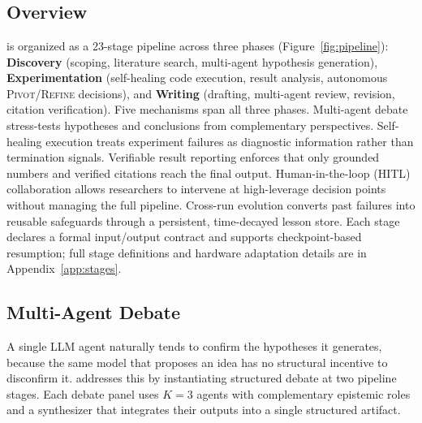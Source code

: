 \vspace{-0.5em}
\section{\system{}}
\label{sec:method}
\vspace{-0.5em}

\vspace{-0.3em}
\subsection{Overview}
\label{sec:overview}
\vspace{-0.3em}

\system{} is organized as a 23-stage pipeline across three phases (Figure~\ref{fig:pipeline}):
\textbf{Discovery} (scoping, literature search, multi-agent hypothesis generation),
\textbf{Experimentation} (self-healing code execution, result analysis, autonomous \textsc{Pivot}/\textsc{Refine} decisions),
and \textbf{Writing} (drafting, multi-agent review, revision, citation verification).
Five mechanisms span all three phases.
Multi-agent debate stress-tests hypotheses and conclusions from complementary perspectives.
Self-healing execution treats experiment failures as diagnostic information rather than termination signals.
Verifiable result reporting enforces that only grounded numbers and verified citations reach the final output.
Human-in-the-loop (HITL) collaboration allows researchers to intervene at high-leverage decision points without managing the full pipeline.
Cross-run evolution converts past failures into reusable safeguards through a persistent, time-decayed lesson store.
Each stage declares a formal input/output contract and supports checkpoint-based resumption; full stage definitions and hardware adaptation details are in Appendix~\ref{app:stages}.

\vspace{-0.3em}
\subsection{Multi-Agent Debate}
\label{sec:debate}
\vspace{-0.3em}

A single LLM agent naturally tends to confirm the hypotheses it generates, because the same model that proposes an idea has no structural incentive to disconfirm it.
\system{} addresses this by instantiating structured debate at two pipeline stages.
Each debate panel uses $K{=}3$ agents with complementary epistemic roles and a synthesizer that integrates their outputs into a single structured artifact.

